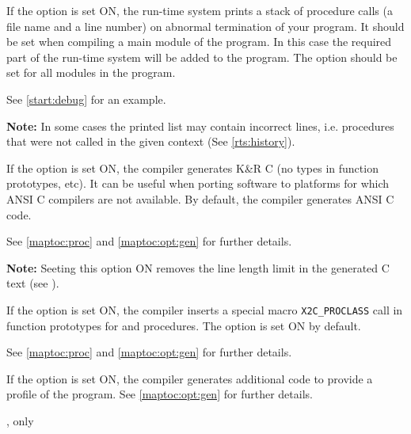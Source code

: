 \begin{description}

        If the option is set ON, the run-time system prints a stack of
        procedure calls (a file name and a line number) on abnormal
        termination of your program. It should be set when compiling a
        main module of the program. In this case the required part of
        the run-time system will be added to the program.  The option
         should be set for all modules in the program.

        See \ref{start:debug} for an example.

\ifgencode
        {\bf Note:} In some cases the printed list may contain incorrect
        lines, i.e. procedures that were not called in the given context
        (See \ref{rts:history}).
\fi

\ifgenc
{}
        \MLBegin{}\ModeC{}\MLEnd{} \header

        If the option is set ON, the compiler generates K\&R C
        (no types in function prototypes, etc).
        It can be useful when porting software to platforms
        for which ANSI C compilers are not available.
        By default, the compiler generates ANSI C code.

        See \ref{maptoc:proc} and \ref{maptoc:opt:gen} for
        further details.

        {\bf Note:} Seeting this option ON removes the line length
        limit in the generated C text (see ).
\fi

\ifgenc
{}
        \MLBegin{}\ModeC{}\MLEnd{} \header

        If the option is set ON, the compiler inserts a special macro
        \verb|X2C_PROCLASS| call in function prototypes for \mt{} and
        \ot{} procedures. The option is set ON by default.

        See \ref{maptoc:proc} and \ref{maptoc:opt:gen} for
        further details.

\fi

\ifgenc
{}
        \MLBegin{}\ModeC{}\MLEnd{} \header

        If the option is set ON, the compiler generates additional code
        to provide a profile of the program. See \ref{maptoc:opt:gen}
        for further details.

\fi

\ifgencode
{}
        \MLBegin{}\ModeC{}, \ot{} only\MLEnd{} \header


\end{description}
